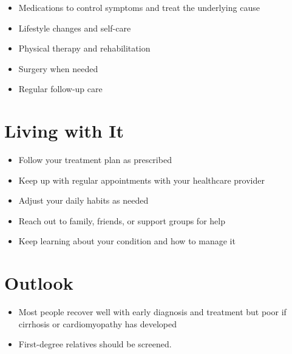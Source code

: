 \begin{itemize}[noitemsep]
  \item Medications to control symptoms and treat the underlying cause
  \item Lifestyle changes and self-care
  \item Physical therapy and rehabilitation
  \item Surgery when needed
  \item Regular follow-up care
\end{itemize}

\section{Living with It}

\begin{itemize}[noitemsep]
  \item Follow your treatment plan as prescribed
  \item Keep up with regular appointments with your healthcare provider
  \item Adjust your daily habits as needed
  \item Reach out to family, friends, or support groups for help
  \item Keep learning about your condition and how to manage it
\end{itemize}

\section{Outlook}

\begin{itemize}[noitemsep]
  \item Most people recover well with early diagnosis and treatment but poor if cirrhosis or cardiomyopathy has developed
  \item First-degree relatives should be screened.
\end{itemize}
